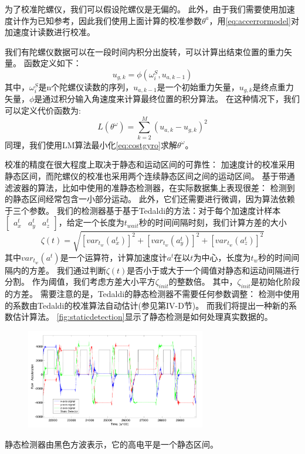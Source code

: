 \documentclass[
  type=master
]{gdutthesis}
\begin{document}
为了校准陀螺仪，我们可以假设陀螺仪是无偏的。
此外，由于我们需要使用加速度计作为已知参考，因此我们使用上面计算的校准参数$\theta^a$，用\autoref{eq:accerrormodel}对加速度计读数进行校准。

我们有陀螺仪数据可以在一段时间内积分出旋转，可以计算出结束位置的重力矢量。
函数定义如下：
\begin{equation}\label{eq:integration}
	u_{g,k}=\phi(\omega^S_i , u_{a,k-1})
\end{equation}
其中，$\omega^S_i$是n个陀螺仪读数的序列，$u_{a,k-1}$是一个初始重力矢量，$u_{g,k}$是终点重力矢量，$\phi$是通过积分输入角速度来计算最终位置的积分算法。
在这种情况下，我们可以定义代价函数为:
\begin{equation}\label{eq:costgyro}
	L(\theta^\omega)=\sum_{k=2}^{M}(u_{a,k}-u_{g,k})^2
\end{equation}
同理，我们使用LM算法最小化\autoref{eq:costgyro}求解$\theta^\omega$。

校准的精度在很大程度上取决于静态和运动区间的可靠性：
加速度计的校准采用静态区间，而陀螺仪的校准也采用两个连续静态区间之间的运动区间。
基于带通滤波器的算法，比如\cite{fong2008methods}中使用的准静态检测器，在实际数据集上表现很差：
检测到的静态区间经常包含一小部分运动。
此外，它们还需要进行微调，因为算法依赖于三个参数。
我们的检测器基于基于Tedaldi的方法\cite{tedaldi2014robust}：对于每个加速度计样本$\begin{bmatrix}
	a^t_x & a^t_y & a^t_z
\end{bmatrix}$，给定一个长度为$t_{wait}$秒的时间间隔时刻，我们计算方差的大小
\begin{equation}\label{eq:var}
	\zeta(t)=\sqrt{[var_{t_w}(a^t_x)]^2+[var_{t_w}(a^t_y)]^2+[var_{t_w}(a^t_z)]^2}
\end{equation}
其中$var_{t_w}(a^t)$是一个运算符，计算加速度计$a^t$在以$t$为中心，长度为$t_w$秒的时间间隔内的方差。
我们通过判断$\zeta(t)$是否小于或大于一个阈值对静态和运动间隔进行分割。
作为阈值，我们考虑方差大小平方$\zeta_{init}$的整数倍。
其中，$\zeta_{init}$是初始化阶段的方差。
需要注意的是，Tedaldi的静态检测器不需要任何参数调整：
检测中使用的系数由Tedaldi的校准算法自动估计(参见第IV-D节)。
而我们将提出一种新的系数估计算法。
\autoref{fig:staticdetection}显示了静态检测是如何处理真实数据的。
\begin{figure}[htbp]
	\centering
	\includegraphics[width=0.7\textwidth]{屏幕截图 2022-04-03 103640.png}
	\label{fig:staticdetection}
\end{figure}
静态检测器由黑色方波表示，它的高电平是一个静态区间。
\end{document}
